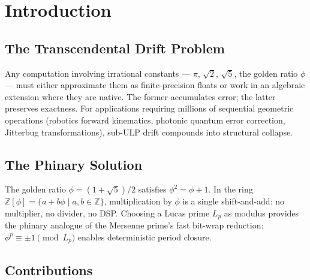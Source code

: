 \documentclass[conference]{IEEEtran}
\begin{document}
\section{Introduction}

\subsection{The Transcendental Drift Problem}

Any computation involving irrational constants --- $\pi$, $\sqrt{2}$, $\sqrt{5}$, the golden ratio $\phi$ --- must either approximate them as finite-precision floats or work in an algebraic extension where they are native. The former accumulates error; the latter preserves exactness. For applications requiring millions of sequential geometric operations (robotics forward kinematics, photonic quantum error correction, Jitterbug transformations), sub-ULP drift compounds into structural collapse.

\subsection{The Phinary Solution}

The golden ratio $\phi = (1+\sqrt{5})/2$ satisfies $\phi^2 = \phi + 1$. In the ring $\mathbb{Z}[\phi] = \{a + b\phi \mid a,b \in \mathbb{Z}\}$, multiplication by $\phi$ is a single shift-and-add: no multiplier, no divider, no DSP. Choosing a Lucas prime $L_p$ as modulus provides the phinary analogue of the Mersenne prime's fast bit-wrap reduction: $\phi^p \equiv \pm 1 \pmod{L_p}$ enables deterministic period closure.

\subsection{Contributions}
\end{document}
